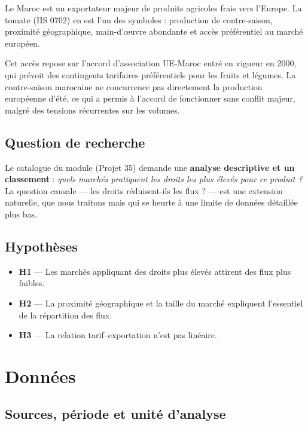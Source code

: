 \documentclass[11pt,a4paper]{article}
\begin{document}
Le Maroc est un exportateur majeur de produits agricoles frais vers l'Europe. La
tomate (HS 0702) en est l'un des symboles : production de contre-saison, proximité
géographique, main-d'œuvre abondante et accès préférentiel au marché européen.

Cet accès repose sur l'accord d'association UE-Maroc entré en vigueur en 2000, qui
prévoit des contingents tarifaires préférentiels pour les fruits et légumes. La
contre-saison marocaine ne concurrence pas directement la production européenne
d'été, ce qui a permis à l'accord de fonctionner sans conflit majeur, malgré des
tensions récurrentes sur les volumes.

\subsection{Question de recherche}

Le catalogue du module (Projet 35) demande une \textbf{analyse descriptive et un
classement} : \emph{quels marchés pratiquent les droits les plus élevés pour ce
produit ?} La question causale — les droits réduisent-ils les flux ? — est une
extension naturelle, que nous traitons mais qui se heurte à une limite de données
détaillée plus bas.

\subsection{Hypothèses}

\begin{itemize}[leftmargin=1.2cm]
    \item \textbf{H1} — Les marchés appliquant des droits plus élevés attirent des
          flux plus faibles.
    \item \textbf{H2} — La proximité géographique et la taille du marché expliquent
          l'essentiel de la répartition des flux.
    \item \textbf{H3} — La relation tarif--exportation n'est pas linéaire.
\end{itemize}

\section{Données}\label{sec:data}

\subsection{Sources, période et unité d'analyse}
\end{document}
